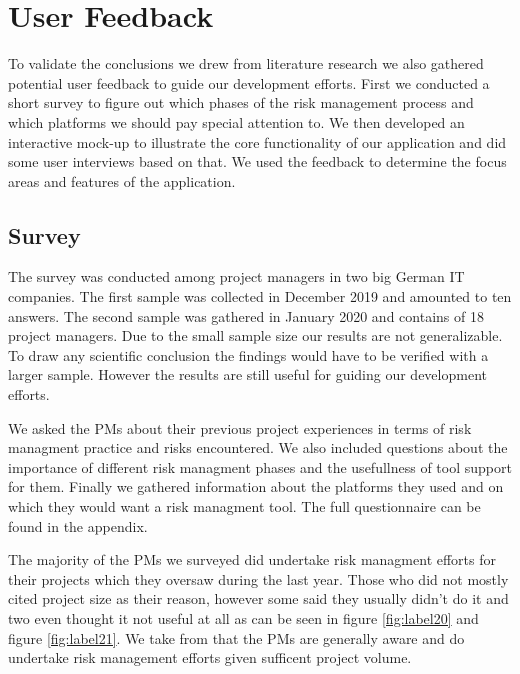 
\section{User Feedback}
\label{sec:DomainA}
To validate the conclusions we drew from literature research we also gathered potential user feedback to guide our development efforts. First we conducted a short survey to figure out which phases of the risk management process and which platforms we should pay special attention to. We then developed an interactive mock-up to illustrate the core functionality of our application and did some user interviews based on that. We used the feedback to determine the focus areas and features of the application.
\subsection{Survey}
\label{sec:DomainAa}
The survey was conducted among project managers in two big German IT companies. The first sample was collected in December 2019 and amounted to ten answers. The second sample was gathered in January 2020 and contains of 18 project managers. Due to the small sample size our results are not generalizable. To draw any scientific conclusion the findings would have to be verified with a larger sample. However the results are still useful for guiding our development efforts.

We asked the PMs about their previous project experiences in terms of risk managment practice and risks encountered. We also included questions about the importance of different risk managment phases and the usefullness of tool support for them. Finally we gathered information about the platforms they used and on which they would want a risk managment tool. The full questionnaire can be found in the appendix.

The majority of the PMs we surveyed did undertake risk managment efforts for their projects which they oversaw during the last year. Those who did not mostly cited project size as their reason, however some said they usually didn't do it and two even thought it not useful at all as can be seen in figure \ref{fig:label20} and figure \ref{fig:label21}. We take from that the PMs are generally aware and do undertake risk management efforts given sufficent project volume.


